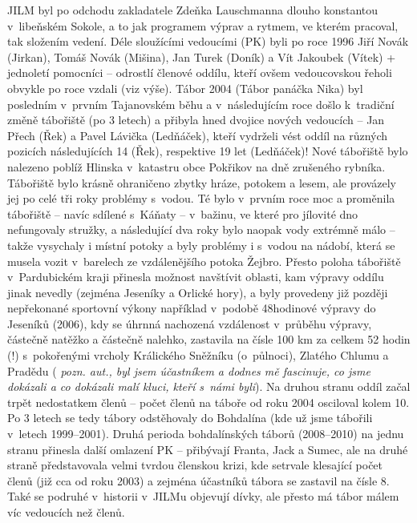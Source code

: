 \documentclass[a5paper, 11pt, twoside]{article}
\newcommand{\pozned}[1]{%
\textit{#1}}
\begin{document}
JILM byl po odchodu zakladatele Zdeňka Lauschmanna dlouho konstantou
v~libeňském Sokole, a to jak programem výprav a rytmem, ve kterém
pracoval, tak složením vedení. Déle sloužícími vedoucími (PK) byli po
roce 1996 Jiří Novák (Jirkan), Tomáš Novák (Mišina), Jan Turek (Doník) a
Vít Jakoubek (Vítek) + jednoletí pomocníci -- odrostlí členové oddílu,
kteří ovšem vedoucovskou řeholi obvykle po roce vzdali (viz výše). Tábor
2004 (Tábor panáčka Nika) byl posledním v~prvním Tajanovském běhu a
v~následujícím roce došlo k~tradiční změně tábořiště (po 3 letech) a
přibyla hned dvojice nových vedoucích -- Jan Přech (Řek) a Pavel Lávička
(Ledňáček), kteří vydrželi vést oddíl na různých pozicích následujících
14 (Řek), respektive 19 let (Ledňáček)! Nové tábořiště bylo nalezeno
poblíž Hlinska v~katastru obce Pokřikov na dně zrušeného rybníka.
Tábořiště bylo krásně ohraničeno zbytky hráze, potokem a lesem, ale
provázely jej po celé tři roky problémy s~vodou. Té bylo v~prvním roce
moc a proměnila tábořiště -- navíc sdílené s~Káňaty -- v~bažinu, ve
které pro jílovité dno nefungovaly stružky, a následující dva roky bylo
naopak vody extrémně málo -- takže vysychaly i místní potoky a byly
problémy i s~vodou na nádobí, která se musela vozit v~barelech ze
vzdálenějšího potoka Žejbro. Přesto poloha tábořiště v~Pardubickém kraji
přinesla možnost navštívit oblasti, kam výpravy oddílu jinak nevedly
(zejména Jeseníky a Orlické hory), a byly provedeny již později
nepřekonané sportovní výkony například v~podobě 48hodinové výpravy do
Jeseníků (2006), kdy se úhrnná nachozená vzdálenost v~průběhu výpravy,
částečně natěžko a částečně nalehko, zastavila na čísle 100 km za celkem
52 hodin (!) s~pokořenými vrcholy Králického Sněžníku (o~půlnoci),
Zlatého Chlumu a Pradědu (\pozned{pozn. aut., byl jsem účastníkem a dodnes
mě fascinuje, co jsme dokázali a co dokázali malí kluci, kteří s~námi
byli}). Na druhou stranu oddíl začal trpět nedostatkem členů -- počet
členů na táboře od roku 2004 osciloval kolem 10. Po 3 letech se tedy
tábory odstěhovaly do Bohdalína (kde už jsme tábořili v~letech
1999--2001). Druhá perioda bohdalínských táborů (2008--2010) na jednu
stranu přinesla další omlazení PK -- přibývají Franta, Jack a Sumec, ale
na druhé straně představovala velmi tvrdou členskou krizi, kde setrvale
klesající počet členů (již cca od roku 2003) a zejména účastníků tábora
se zastavil na čísle 8. Také se podruhé v~historii v~JILMu objevují
dívky, ale přesto má tábor málem víc vedoucích než členů.
\end{document}
